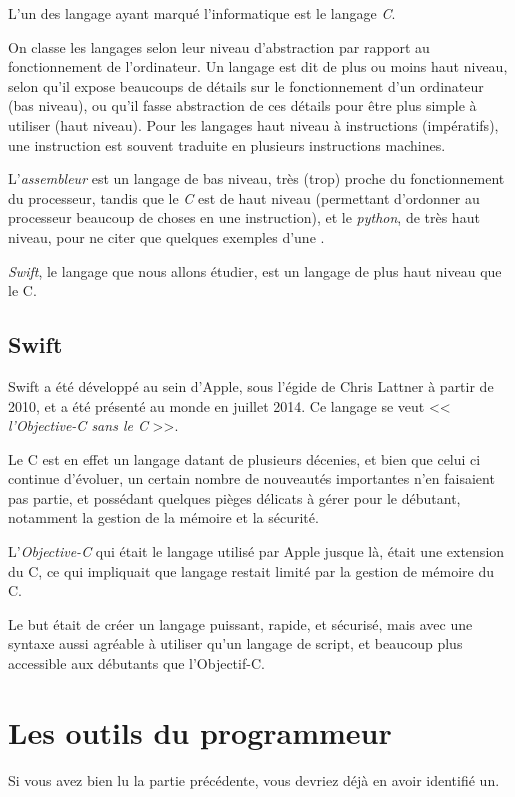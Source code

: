 L'un des langage ayant marqué l'informatique est le langage \emph{C}.

On classe les langages selon leur niveau d'abstraction
par rapport au fonctionnement de l'ordinateur.
Un langage est dit de plus ou moins haut niveau,
selon qu'il expose beaucoups de détails sur le fonctionnement d'un ordinateur (bas niveau),
ou qu'il fasse abstraction de ces détails pour être plus simple à utiliser (haut niveau).
Pour les langages haut niveau à instructions (impératifs),
une instruction est souvent traduite en plusieurs instructions machines.

L'\emph{assembleur} est un langage de bas niveau,
très (trop) proche du fonctionnement du processeur,
tandis que le \emph{C} est de haut niveau
(permettant d'ordonner au processeur beaucoup de choses en une instruction),
et le \emph{python}, de très haut niveau,
pour ne citer que quelques exemples d'une 
.

\emph{Swift}, le langage que nous allons étudier, est un langage de plus haut niveau
que le C.
\subsection{Swift}
Swift a été développé au sein d'Apple, sous l'égide de Chris Lattner à partir de 2010, et a
été présenté au monde en juillet 2014. Ce langage se veut << \emph{l'Objective-C sans le C} >>.

Le C est en effet un langage datant de plusieurs décenies,
et bien que celui ci continue d'évoluer,
un certain nombre de nouveautés importantes n'en faisaient pas partie,
et possédant quelques pièges délicats à gérer pour le débutant,
notamment la gestion de la mémoire et la sécurité.

L'\emph{Objective-C} qui était le langage utilisé par Apple jusque là,
était une extension du C, ce qui impliquait que langage restait limité
par la gestion de mémoire du C.

Le but était de créer un langage puissant, rapide, et sécurisé, mais avec une syntaxe
aussi agréable à utiliser qu’un langage de script,
et beaucoup plus accessible aux débutants que l'Objectif-C.
\section{Les outils du programmeur}
Si vous avez bien lu la partie précédente, vous devriez déjà en avoir identifié un.

